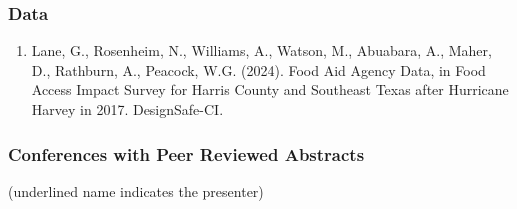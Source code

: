 \documentclass[11pt,oneside]{article}
\begin{document}
\subsubsection{Data}
\begin{enumerate}[leftmargin=40pt]
\item Lane, G., Rosenheim, N., Williams, A., Watson, M., Abuabara, A., Maher, D., Rathburn, A., Peacock, W.G. (2024). Food Aid Agency Data, in Food Access Impact Survey for Harris County and Southeast Texas after Hurricane Harvey in 2017. DesignSafe-CI.
\end{enumerate}

\subsubsection{Conferences with Peer Reviewed Abstracts}
{\small (underlined name indicates the presenter)}
\end{document}
